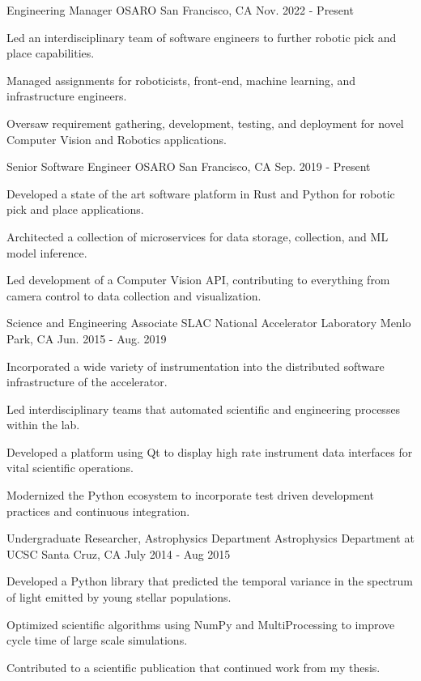 \begin{cventries}
  \cventry
    {Engineering Manager}
    {OSARO}
    {San Francisco, CA}
    {Nov. 2022 - Present}
    {
      \begin{cvitems}
        \item {Led an interdisciplinary team of software engineers to further robotic pick and place capabilities.}
        \item {Managed assignments for roboticists, front-end, machine learning, and infrastructure engineers.}
        \item {Oversaw requirement gathering, development, testing, and deployment for novel Computer Vision and Robotics applications.}
      \end{cvitems}
    }
  \cventry
    {Senior Software Engineer}
    {OSARO}
    {San Francisco, CA}
    {Sep. 2019 - Present}
    {
      \begin{cvitems}
        \item {Developed a state of the art software platform in Rust and Python for robotic pick and place applications.}
        \item {Architected a collection of microservices for data storage, collection, and ML model inference.}
        \item {Led development of a Computer Vision API, contributing to everything from camera control to data collection and visualization.}
      \end{cvitems}
    }
  \cventry
    {Science and Engineering Associate}
    {SLAC National Accelerator Laboratory}
    {Menlo Park, CA}
    {Jun. 2015 - Aug. 2019}
    {
      \begin{cvitems}
	     \item {Incorporated a wide variety of instrumentation into the distributed software infrastructure of the accelerator.}
         \item {Led interdisciplinary teams that automated scientific and engineering processes within the lab.}
         \item {Developed a platform using Qt to display high rate instrument data interfaces for vital scientific operations.}
	     \item {Modernized the Python ecosystem to incorporate test driven development practices and continuous integration.}
      \end{cvitems}
    }
  \cventry
    {Undergraduate Researcher, Astrophysics Department}
    {Astrophysics Department at UCSC}
    {Santa Cruz, CA}
    {July 2014 - Aug 2015}
    {
      \begin{cvitems}
        \item {Developed a Python library that predicted the temporal variance in the spectrum of light emitted by young stellar populations.}
        \item {Optimized scientific algorithms using NumPy and MultiProcessing to improve cycle time of large scale simulations.}
        \item {Contributed to a scientific publication that continued work from my thesis.}
      \end{cvitems}
      }
\end{cventries}
